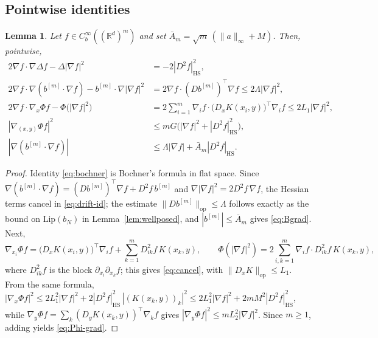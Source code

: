 \documentclass[11pt]{amsart}
\numberwithin{equation}{section}
\theoremstyle{plain}
\newtheorem{lemma}[theorem]{Lemma}
\theoremstyle{remark}
\newcommand{\R}{\mathbb{R}}
\newcommand{\HS}{\mathrm{HS}}
\newcommand{\op}{\mathrm{op}}
\newcommand{\Lip}{\mathrm{Lip}}
\begin{document}
\subsection{Pointwise identities}

\begin{lemma}\label{lem:pointwise}
Let $f\in C^\infty_b((\R^d)^m)$ and set $\bar A_m=\sqrt m\,(\|a\|_\infty+M)$. Then, pointwise,
\begin{align}
2\nabla f\cdot\nabla\Delta f-\Delta|\nabla f|^2&=-2|D^2f|_\HS^2,\label{eq:bochner}\\
2\nabla f\cdot\nabla(b^{[m]}\cdot\nabla f)-b^{[m]}\cdot\nabla|\nabla f|^2&=2\nabla f\cdot(Db^{[m]})^{\top}\nabla f\le2\Lambda|\nabla f|^2,\label{eq:drift-id}\\
2\nabla f\cdot\nabla_x\Phi f-\Phi\big(|\nabla f|^2\big)&=2\sum_{i=1}^m\nabla_if\cdot\big(D_xK(x_i,y)\big)^{\top}\nabla_if\le2L_1|\nabla f|^2,\label{eq:cancel}\\
|\nabla_{(x,y)}\Phi f|^2&\le mG\big(|\nabla f|^2+|D^2f|^2_\HS\big),\label{eq:Phi-grad}\\
|\nabla(b^{[m]}\cdot\nabla f)|&\le\Lambda|\nabla f|+\bar A_m|D^2f|_\HS.\label{eq:Bgrad}
\end{align}
\end{lemma}

\begin{proof}
Identity \eqref{eq:bochner} is Bochner's formula in flat space. Since $\nabla(b^{[m]}\cdot\nabla f)=(Db^{[m]})^{\top}\nabla f+D^2f\,b^{[m]}$ and $\nabla|\nabla f|^2=2D^2f\,\nabla f$, the Hessian terms cancel in \eqref{eq:drift-id}; the estimate $\|Db^{[m]}\|_\op\le\Lambda$ follows exactly as the bound on $\Lip(b_N)$ in Lemma~\ref{lem:wellposed}, and $|b^{[m]}|\le \bar A_m$ gives \eqref{eq:Bgrad}. Next,
\[
\nabla_{x_i}\Phi f=\big(D_xK(x_i,y)\big)^{\top}\nabla_if+\sum_{k=1}^mD^2_{ik}f\,K(x_k,y),\qquad \Phi(|\nabla f|^2)=2\sum_{i,k=1}^m\nabla_if\cdot D^2_{ik}f\,K(x_k,y),
\]
where $D^2_{ik}f$ is the block $\partial_{x_i}\partial_{x_k}f$; this gives \eqref{eq:cancel}, with $\|D_xK\|_\op\le L_1$. From the same formula, $|\nabla_x\Phi f|^2\le2L_1^2|\nabla f|^2+2|D^2f|^2_\HS\,|(K(x_k,y))_k|^2\le2L_1^2|\nabla f|^2+2mM^2|D^2f|^2_\HS$, while $\nabla_y\Phi f=\sum_k(D_yK(x_k,y))^{\top}\nabla_kf$ gives $|\nabla_y\Phi f|^2\le mL_2^2|\nabla f|^2$. Since $m\ge1$, adding yields \eqref{eq:Phi-grad}.
\end{proof}
\end{document}
